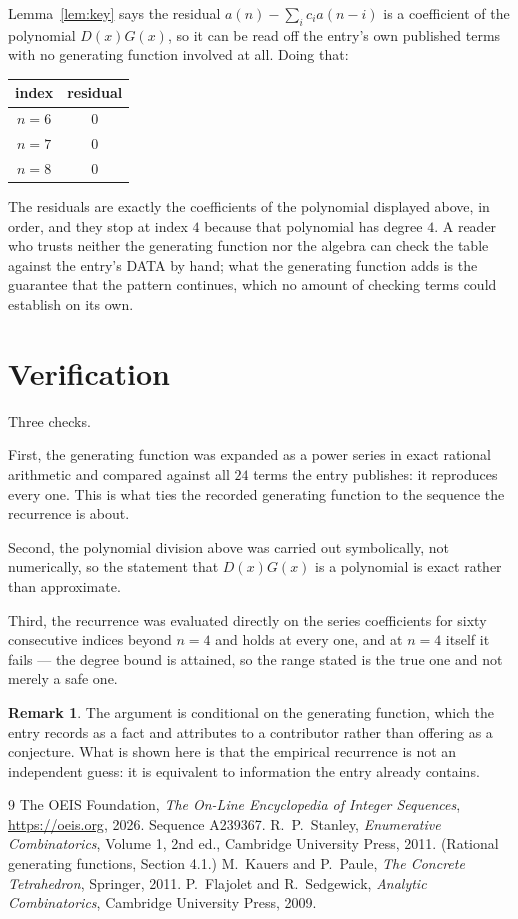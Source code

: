 \documentclass[11pt,a4paper]{article}
\theoremstyle{plain}
\theoremstyle{definition}
\newtheorem{remark}[theorem]{Remark}
\begin{document}
Lemma~\ref{lem:key} says the residual $a(n)-\sum_ic_ia(n-i)$ is a coefficient of the
polynomial $D(x)G(x)$, so it can be read off the entry's own published terms with no
generating function involved at all. Doing that:
\begin{center}
\begin{tabular}{cc}
index & residual \\ \hline
$n=6$ & $0$ \\
$n=7$ & $0$ \\
$n=8$ & $0$
\end{tabular}
\end{center}
The residuals are exactly the coefficients of the polynomial displayed above, in order, and
they stop at index $4$ because that polynomial has degree $4$. A reader who trusts
neither the generating function nor the algebra can check the table against the entry's DATA
by hand; what the generating function adds is the guarantee that the pattern continues, which
no amount of checking terms could establish on its own.

\section{Verification}

Three checks.

First, the generating function was expanded as a power series in exact rational arithmetic and
compared against all $24$ terms the entry publishes: it reproduces every one. This is
what ties the recorded generating function to the sequence the recurrence is about.

Second, the polynomial division above was carried out symbolically, not numerically, so the
statement that $D(x)G(x)$ is a polynomial is exact rather than approximate.

Third, the recurrence was evaluated directly on the series coefficients for sixty consecutive
indices beyond $n=4$ and holds at every one, and at $n=4$ itself it fails --- the
degree bound is attained, so the range stated is the true one and not merely a safe one.

\begin{remark}
The argument is conditional on the generating function, which the entry records as a fact and
attributes to a contributor rather than offering as a conjecture. What is shown here is that
the empirical recurrence is not an independent guess: it is equivalent to information the
entry already contains.
\end{remark}

\begin{thebibliography}{9}
 The OEIS Foundation, \emph{The On-Line Encyclopedia of Integer
Sequences}, \url{https://oeis.org}, 2026. Sequence A239367.
 R.~P.~Stanley, \emph{Enumerative Combinatorics}, Volume 1, 2nd ed.,
Cambridge University Press, 2011. (Rational generating functions, Section 4.1.)
 M.~Kauers and P.~Paule, \emph{The Concrete Tetrahedron}, Springer, 2011.
 P.~Flajolet and R.~Sedgewick, \emph{Analytic Combinatorics}, Cambridge
University Press, 2009.
\end{thebibliography}
\end{document}
